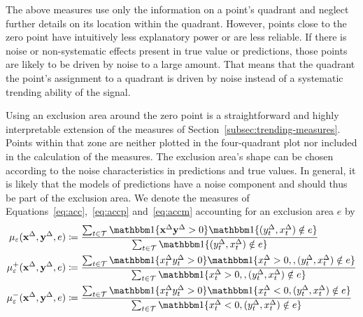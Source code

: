 The above measures use only the information on a point's quadrant and neglect further details on its location within the quadrant.
However, points close to the zero point have intuitively less explanatory power or are less reliable.
If there is noise or non-systematic effects present in true value or predictions, those points are likely to be driven by noise to a large amount.
That means that the quadrant the point's assignment to a quadrant is driven by noise instead of a systematic trending ability of the signal.

Using an exclusion area around the zero point is a straightforward and highly interpretable extension of the measures of Section~\ref{subsec:trending-measures}.
Points within that zone are neither plotted in the four-quadrant plot nor included in the calculation of the measures.
The exclusion area's shape can be chosen according to the noise characteristics in predictions and true values.
In general, it is likely that the models of predictions have a noise component and should thus be part of the exclusion area.
We denote the measures of Equations~\eqref{eq:acc},~\eqref{eq:accp} and~\eqref{eq:accm} accounting for an exclusion area $e$ by
\begin{align}
    \acceps (\diffx, \diffy, e) &\coloneqq \frac{\sum_{t \in \mathcal{T}} \ind{\diffx \diffy > 0} \ind{(\diffyt, \diffxt) \notin e}}{\sum_{t \in \mathcal{T}} \ind{(\diffyt, \diffxt) \notin e}}\label{eq:acceps}\\
    \accpeps (\diffx, \diffy, e) &\coloneqq \frac{\sum_{t \in \mathcal{T}} \ind{\diffxt \diffyt > 0} \ind{\diffxt > 0, , (\diffyt, \diffxt) \notin e}}{\sum_{t \in \mathcal{T}} \ind{\diffxt > 0, , (\diffyt, \diffxt) \notin e}} \label{eq:accpeps}\\
    \accmeps (\diffx, \diffy, e) &\coloneqq \frac{\sum_{t \in \mathcal{T}} \ind{\diffxt \diffyt > 0} \ind{\diffxt < 0, (\diffyt, \diffxt) \notin e}}{\sum_{t \in \mathcal{T}} \ind{\diffxt < 0, (\diffyt, \diffxt) \notin e}}\label{eq:accmeps}
\end{align}



